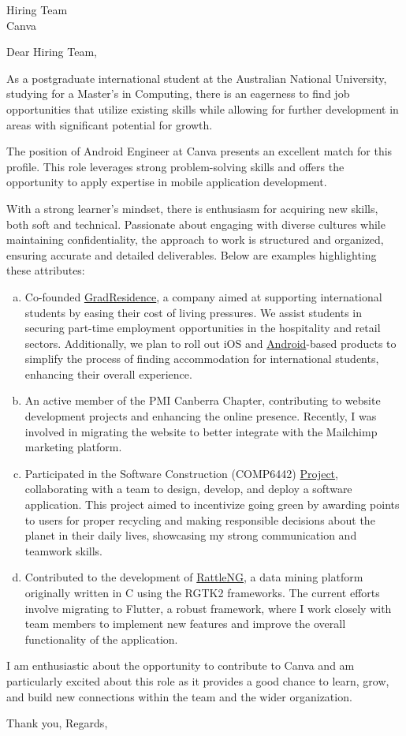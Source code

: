 \documentclass{letter}
\begin{document}
\begin{letter}{Hiring Team\\Canva}
\opening{Dear Hiring Team,}

As a postgraduate international student at the Australian National University, studying for a Master's in Computing, there is an eagerness to find job opportunities that utilize existing skills while allowing for further development in areas with significant potential for growth.

The position of Android Engineer at Canva presents an excellent match for this profile. This role leverages strong problem-solving skills and offers the opportunity to apply expertise in mobile application development.

With a strong learner's mindset, there is enthusiasm for acquiring new skills, both soft and technical. Passionate about engaging with diverse cultures while maintaining confidentiality, the approach to work is structured and organized, ensuring accurate and detailed deliverables. Below are examples highlighting these attributes:

\begin{enumerate}[(a)]
    \item Co-founded \href{https://gradresidence.com/}{GradResidence}, a company aimed at supporting international students by easing their cost of living pressures. We assist students in securing part-time employment opportunities in the hospitality and retail sectors. Additionally, we plan to roll out iOS and \href{https://github.com/gradresidence/android}{Android}-based products to simplify the process of finding accommodation for international students, enhancing their overall experience.
    \item An active member of the PMI Canberra Chapter, contributing to website development projects and enhancing the online presence. Recently, I was involved in migrating the website to better integrate with the Mailchimp marketing platform.
    \item Participated in the Software Construction (COMP6442) \href{https://gitlab.cecs.anu.edu.au/u7544253/ga-23s1-comp2100-6442}{Project}, collaborating with a team to design, develop, and deploy a software application. This project aimed to incentivize going green by awarding points to users for proper recycling and making responsible decisions about the planet in their daily lives, showcasing my strong communication and teamwork skills.
    \item Contributed to the development of \href{https://github.com/gjwgit/rattleng}{RattleNG}, a data mining platform originally written in C using the RGTK2 frameworks. The current efforts involve migrating to Flutter, a robust framework, where I work closely with team members to implement new features and improve the overall functionality of the application.
\end{enumerate}

I am enthusiastic about the opportunity to contribute to Canva and am particularly excited about this role as it provides a good chance to learn, grow, and build new connections within the team and the wider organization.

\closing{Thank you, Regards,}
\end{letter}
\end{document}

